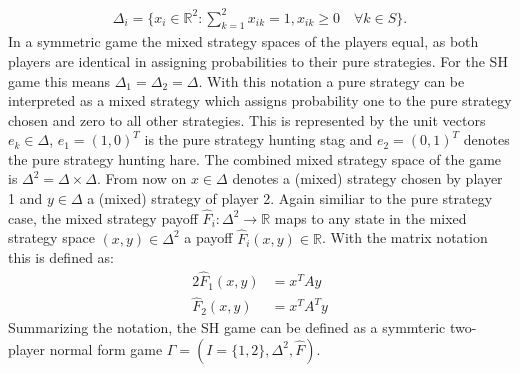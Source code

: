 \documentclass[11pt]{article}
\newcommand{\realnumb}{\mathbb{R}}
\begin{document}
\begin{align*}
        \Delta_i = \{ x_i \in \realnumb^2 : \sum_{k=1}^2 x_{ik} = 1, x_{ik} \geq 0 \quad
\forall k \in S\}.
\end{align*}
In a symmetric game the mixed strategy spaces of the players
equal, as both players are identical in assigning probabilities to their
pure strategies. For the SH game this means $\Delta_1 = \Delta_2 = \Delta$.
With this notation a pure strategy can be interpreted as a mixed strategy
which assigns probability one to the pure strategy chosen and zero to all
other strategies. This is represented by the unit vectors 
$e_k \in \Delta$, $e_1 = (1,0)^T$ is the pure strategy hunting stag 
and $e_2 =(0,1)^T$ denotes the pure strategy hunting hare.
The combined mixed strategy space of the game is $\Delta^2 = \Delta \times
\Delta$.
From now on $x \in \Delta$ denotes a (mixed) strategy
chosen by player 1 and $y \in \Delta$ a (mixed) strategy of player 2.
Again similiar to the pure strategy case, the mixed strategy payoff 
$\hat{F}_i:\Delta^2 \rightarrow \realnumb$ maps to any state in the mixed strategy
space  $(x,y) \in \Delta^2$ a payoff $\hat{F}_i(x,y) \in \realnumb$.
With the matrix notation this is defined as: 
\begin{alignat*}{2}
        \hat{F}_1(x,y) &= x^T A y \\
        \hat{F}_2(x,y) &= x^T A^T y 
\end{alignat*}
Summarizing the notation, the SH game can be defined as a symmteric two-player
normal form game $\Gamma = (I=\{1,2\}, \Delta^2, \hat{F})$.
\end{document}
